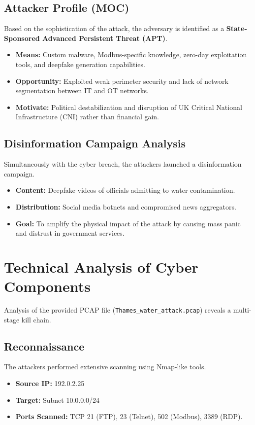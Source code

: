 \documentclass[12pt,a4paper]{article}
\begin{document}
\subsection{Attacker Profile (MOC)}
Based on the sophistication of the attack, the adversary is identified as a \textbf{State-Sponsored Advanced Persistent Threat (APT)}.

\begin{itemize}
    \item \textbf{Means:} Custom malware, Modbus-specific knowledge, zero-day exploitation tools, and deepfake generation capabilities.
    \item \textbf{Opportunity:} Exploited weak perimeter security and lack of network segmentation between IT and OT networks.
    \item \textbf{Motivate:} Political destabilization and disruption of UK Critical National Infrastructure (CNI) rather than financial gain.
\end{itemize}

\subsection{Disinformation Campaign Analysis}
Simultaneously with the cyber breach, the attackers launched a disinformation campaign.
\begin{itemize}
    \item \textbf{Content:} Deepfake videos of officials admitting to water contamination.
    \item \textbf{Distribution:} Social media botnets and compromised news aggregators.
    \item \textbf{Goal:} To amplify the physical impact of the attack by causing mass panic and distrust in government services.
\end{itemize}

\section{Technical Analysis of Cyber Components}
Analysis of the provided PCAP file (\texttt{Thames\_water\_attack.pcap}) reveals a multi-stage kill chain.

\subsection{Reconnaissance}
The attackers performed extensive scanning using Nmap-like tools.
\begin{itemize}
    \item \textbf{Source IP:} 192.0.2.25
    \item \textbf{Target:} Subnet 10.0.0.0/24
    \item \textbf{Ports Scanned:} TCP 21 (FTP), 23 (Telnet), 502 (Modbus), 3389 (RDP).
\end{itemize}
\end{document}
